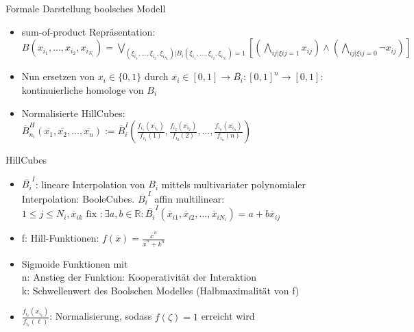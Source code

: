 \documentclass[handout]{beamer}
\begin{document}
\begin{frame}{Formale Darstellung boolsches Modell}
\begin{itemize}
	\item sum-of-product Repr\"asentation: $B(x_{i_{1}}, ..., x_{i_{2}}, x_{i_{N_{i}}}) = \bigvee_{(\xi_{i_{1}}, ..., \xi_{i_{2}}, \xi_{i_{N_{i}}}) | B_{i}(\xi_{i_{1}}, ..., \xi_{i_{2}}, \xi_{i_{N_{i}}})=1 } [(\bigwedge_{ij | \xi{ij} = 1} x_{ij}) \wedge (\bigwedge_{ij | \xi{ij} = 0} \neg x_{ij})] $
	\pause
	\item Nun ersetzen von $x_{i} \in \{0,1\}$ durch $\overline{x_{i}} \in [0,1] \rightarrow \overline{B_{i}}: [0,1]^{n} \to [0,1]$: kontinuierliche homologe von $B_{i}$
	\pause
	\item Normalisierte HillCubes: $\overline{B}^{H}_{n_{i}}(\overline{x_{1}}, \overline{x_{2}},...,\overline{x_{n}}) := \overline{B}^{I}_{i}(\frac{f_{i_{1}}(\overline{x_{i_{1}}})}{f_{i_{1}}(1)},\frac{f_{i_{2}}(\overline{x_{i_{2}}})}{f_{i_{2}}(2)},...,\frac{f_{i_{n}}(\overline{x_{i_{n}}})}{f_{i_{n}}(n)})$
\end{itemize}
\end{frame}

\begin{frame}{HillCubes}
\begin{itemize}
	\item $\overline{B_{i}}^{I}$: lineare Interpolation von $B_{i}$ mittels multivariater polynomialer Interpolation: BooleCubes. 
	\pause
	$\overline{B_{i}}^{I}$ affin multilinear: $ 1 \leq j \leq N_{i}, \overline{x}_{ik} \text{ fix }: \exists a,b \in \mathbb{R}: \overline{B_{i}}^{I}(\overline{x}_{i1},\overline{x}_{i2},...,\overline{x}_{iN_{i}}) = a + b \overline{x}_{ij}$
	\pause
	\item f: Hill-Funktionen: $f(\overline{x}) = \frac{\overline{x}^{n}}{\overline{x}^{n} + k^{n}}$
	\pause
	\item Sigmoide Funktionen mit
	\\ n: Anstieg der Funktion: Kooperativit\"at der Interaktion
	\\ k: Schwellenwert des Boolschen Modelles (Halbmaximalit\"at von f)
	\pause
	\item $\frac{f_{i_{\ell}}(\overline{x_{i_{\ell}}})}{f_{i_{\ell}}(\ell)}$: Normalisierung, sodass $f(\zeta)=1$ erreicht wird
\end{itemize}
\end{frame}
\end{document}
